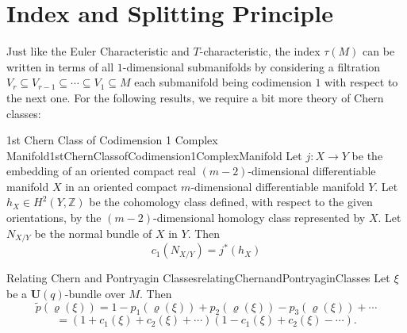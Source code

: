 \documentclass{ut-thesis}
\newenvironment{Proof}[1][]
  {\begin{ProofTcb}[#1]}
  {\end{ProofTcb}}
\newcommand{\sse}{\subseteq}
\renewcommand{\bf}[1]{\textbf{#1}}
\begin{document}
\section{Index and Splitting Principle}


Just like the Euler Characteristic and $T$-characteristic, the index $\tau(M)$ can be written in terms of all
$1$-dimensional submanifolds by considering a filtration $V_r \sse V_{r-1} \sse \cdots \sse V_1 \sse M$ each submanifold
being codimension $1$ with respect to the next one. For the following results, we require a bit more theory of
Chern classes:

\begin{thm}{1st Chern Class of Codimension 1 Complex Manifold}{1stChernClassofCodimension1ComplexManifold}
Let $j: X \to Y$ be the embedding of an oriented compact real $(m-2)$-dimensional differentiable manifold $X$ in an
oriented compact $m$-dimensional differentiable manifold $Y$. Let $h_X \in H^2(Y,\mathbb{Z})$ be the cohomology
class defined, with respect to the given orientations, by the $(m-2)$-dimensional homology class represented
by $X$. Let $N_{X/Y}$ be the normal bundle of $X$ in $Y$. Then
\[
  c_1(N_{X/Y}) = j^*(h_X)
\]
\end{thm}

\begin{Proof}
  \cite[theorem 4.8.1]{hirzebruchTopologicalMethodsAlgebraic1995}
\end{Proof}

\begin{thm}{Relating Chern and Pontryagin Classes}{relatingChernandPontryaginClasses}
Let $\xi$ be a $\mathbf{U}(q)$-bundle over $M$. Then
\[
    \tilde{p}(\varrho(\xi)) = 1 - p_1(\varrho(\xi)) + p_2(\varrho(\xi)) - p_3(\varrho(\xi)) + \cdots
\]
\[
    = (1 + c_1(\xi) + c_2(\xi) + \cdots)(1 - c_1(\xi) + c_2(\xi) - \cdots).
\]
\end{thm}

\begin{Proof}
  \cite[theorem~4.5.1]{hirzebruchTopologicalMethodsAlgebraic1995}
\end{Proof}
\end{document}
